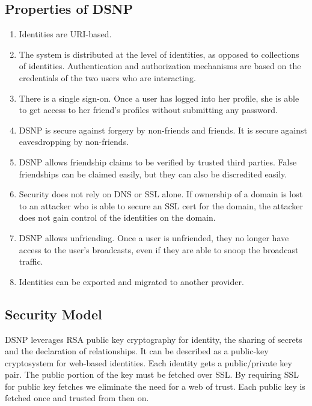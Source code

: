\documentclass[letterpaper,11pt,oneside]{article}
\begin{document}
\subsection{Properties of DSNP}

\begin{enumerate}

\item Identities are URI-based.

\item The system is distributed at the level of identities, as opposed to
collections of identities. Authentication and authorization mechanisms are
based on the credentials of the two users who are interacting.

\item There is a single sign-on. Once a user has logged into her profile, she
is able to get access to her friend's profiles without submitting any password.

\item DSNP is secure against forgery by non-friends and friends. It is secure
against eavesdropping by non-friends.

\item DSNP allows friendship claims to be verified by trusted third parties.
False friendships can be claimed easily, but they can also be discredited
easily.

\item Security does not rely on DNS or SSL alone. If ownership of a domain is
lost to an attacker who is able to secure an SSL cert for the domain, the
attacker does not gain control of the identities on the domain.

\item DSNP allows unfriending. Once a user is unfriended, they no longer have
access to the user's broadcasts, even if they are able to snoop the broadcast
traffic.

\item Identities can be exported and migrated to another provider.

\end{enumerate}

\subsection{Security Model}

DSNP leverages RSA public key cryptography for identity, the sharing of secrets
and the declaration of relationships. It can be described as a public-key
cryptosystem for web-based identities. Each identity gets a public/private key
pair. The public portion of the key must be fetched over SSL. By requiring SSL
for public key fetches we eliminate the need for a web of trust. Each public
key is fetched once and trusted from then on.
\end{document}
